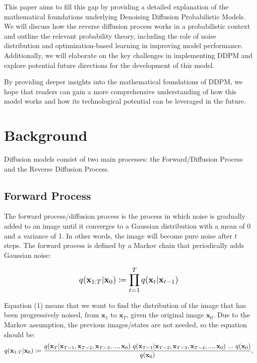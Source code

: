 \documentclass{article}
\newcommand*{\Scale}[2][4]{\scalebox{#1}{\ensuremath{#2}}}
\begin{document}
This paper aims to fill this gap by providing a detailed explanation of the mathematical foundations underlying Denoising Diffusion Probabilistic Models. We will discuss how the reverse diffusion process works in a probabilistic context and outline the relevant probability theory, including the role of noise distribution and optimization-based learning in improving model performance. Additionally, we will elaborate on the key challenges in implementing DDPM and explore potential future directions for the development of this model.

By providing deeper insights into the mathematical foundations of DDPM, we hope that readers can gain a more comprehensive understanding of how this model works and how its technological potential can be leveraged in the future.


\section{Background}


Diffusion models consist of two main processes: the Forward/Diffusion Process and the Reverse Diffusion Process.


\subsection{Forward Process}


The forward process/diffusion process is the process in which noise is gradually added to an image until it converges to a Gaussian distribution with a mean of 0 and a variance of 1. In other words, the image will become pure noise after $ t $ steps. The forward process is defined by a Markov chain that periodically adds Gaussian noise:

\begin{equation}
\Scale[1.2]{ \displaystyle
q(\textbf{x}_{1:T}|\textbf{x}_{0}) \coloneq \displaystyle \prod_{t=1}^{T} q(\textbf{x}_{t}|\textbf{x}_{t-1}) }
\end{equation}

Equation (1) means that we want to find the distribution of the image that has been progressively noised, from $ \textbf{x}_{1} $ to $ \textbf{x}_{T} $, given the original image $ \textbf{x}_{0} $. Due to the Markov assumption, the previous images/states are not needed, so the equation should be:
\begin{equation}
\Scale[1.2]{ \displaystyle
q(\textbf{x}_{1:T}|\textbf{x}_{0}) \coloneq  \frac{q(\textbf{x}_{T}|\textbf{x}_{T-1},\textbf{x}_{T-2},\textbf{x}_{T-3},...,\textbf{x}_{0}) \ q(\textbf{x}_{T-1}|\textbf{x}_{T-2},\textbf{x}_{T-3},\textbf{x}_{T-4},...,\textbf{x}_{0}) \ ... \ q(\textbf{x}_{0})  } {  q(\textbf{x}_{0}) }, }
\end{equation}
\end{document}
